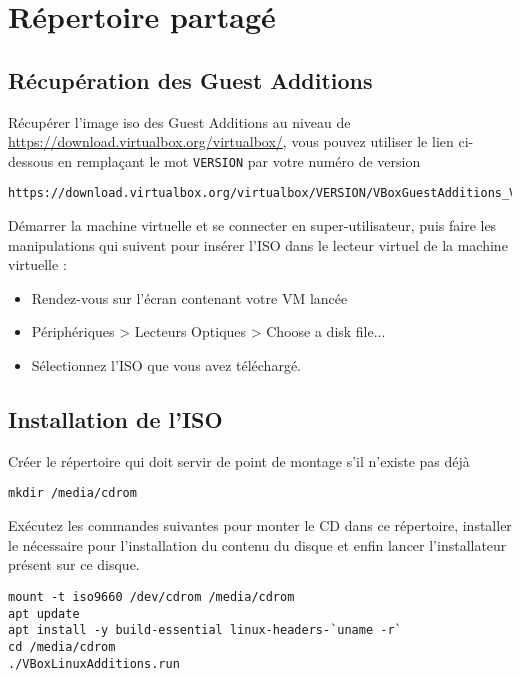 \chapter{Répertoire partagé}

\section{Récupération des Guest Additions}

Récupérer l'image iso des Guest Additions au niveau de \href{https://download.virtualbox.org/virtualbox/}{https://download.virtualbox.org/virtualbox/}, vous pouvez utiliser le lien ci-dessous en remplaçant le mot \texttt{VERSION} par votre numéro de version

\begin{lstlisting}
https://download.virtualbox.org/virtualbox/VERSION/VBoxGuestAdditions_VERSION.iso
\end{lstlisting}

Démarrer la machine virtuelle et se connecter en super-utilisateur, puis faire les manipulations qui suivent pour insérer l'ISO dans le lecteur virtuel de la machine virtuelle :
\begin{itemize}
	\item Rendez-vous sur l'écran contenant votre VM lancée
	\item Périphériques > Lecteurs Optiques > Choose a disk file...
	\item Sélectionnez l'ISO que vous avez téléchargé.
\end{itemize}

\section{Installation de l'ISO}

Créer le répertoire qui doit servir de point de montage s'il n'existe pas déjà

\begin{lstlisting}
mkdir /media/cdrom
\end{lstlisting}

Exécutez les commandes suivantes pour monter le CD dans ce répertoire, installer le nécessaire pour l'installation du contenu du disque et enfin lancer l'installateur présent sur ce disque.

\begin{lstlisting}
mount -t iso9660 /dev/cdrom /media/cdrom
apt update
apt install -y build-essential linux-headers-`uname -r`
cd /media/cdrom
./VBoxLinuxAdditions.run
\end{lstlisting}

